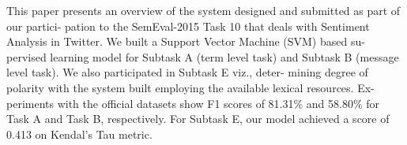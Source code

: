 This paper presents an overview of the system designed and submitted as part of our partici- pation to the SemEval-2015 Task 10 that deals with Sentiment Analysis in Twitter. We built a Support Vector Machine (SVM) based su- pervised learning model for Subtask A (term level task) and Subtask B (message level task). We also participated in Subtask E viz., deter- mining degree of polarity with the system built employing the available lexical resources. Ex- periments with the official datasets show F1 scores of 81.31\% and 58.80\% for Task A and Task B, respectively. For Subtask E, our model achieved a score of 0.413 on Kendal's Tau metric.
